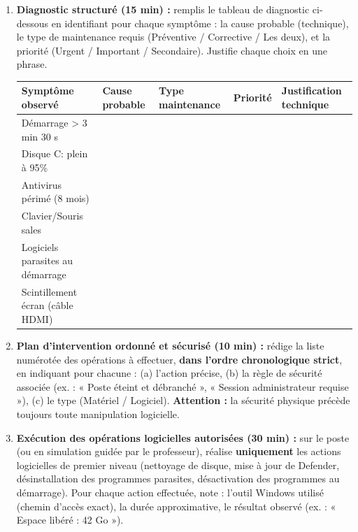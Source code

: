\documentclass[11pt]{article}
\newcommand{\cle}[1]{{\popxbold\color{popdark}#1}}
\begin{document}
\begin{enumerate}
    \item \textbf{Diagnostic structuré (15 min) :} remplis le tableau de diagnostic ci-dessous en identifiant pour chaque symptôme : la \cle{cause probable} (technique), le \cle{type de maintenance} requis (Préventive / Corrective / Les deux), et la \cle{priorité} (Urgent / Important / Secondaire). Justifie chaque choix en une phrase.
    \begin{center}
    \begin{tabularx}{\linewidth}{|X|l|l|l|X|}
    \hline
    \rowcolor{popblueL}
    \textbf{Symptôme observé} & \textbf{Cause probable} & \textbf{Type maintenance} & \textbf{Priorité} & \textbf{Justification technique} \\
    \hline
    Démarrage > 3 min 30 s & & & & \\
    \hline
    Disque C: plein à 95\% & & & & \\
    \hline
    Antivirus périmé (8 mois) & & & & \\
    \hline
    Clavier/Souris sales & & & & \\
    \hline
    Logiciels parasites au démarrage & & & & \\
    \hline
    Scintillement écran (câble HDMI) & & & & \\
    \hline
    \end{tabularx}
    \end{center}

    \item \textbf{Plan d'intervention ordonné et sécurisé (10 min) :} rédige la liste numérotée des opérations à effectuer, \textbf{dans l'ordre chronologique strict}, en indiquant pour chacune : (a) l'action précise, (b) la règle de sécurité associée (ex. : « Poste éteint et débranché », « Session administrateur requise »), (c) le type (Matériel / Logiciel). \textbf{Attention :} la sécurité physique précède toujours toute manipulation logicielle.

    \item \textbf{Exécution des opérations logicielles autorisées (30 min) :} sur le poste (ou en simulation guidée par le professeur), réalise \textbf{uniquement} les actions logicielles de premier niveau (nettoyage de disque, mise à jour de Defender, désinstallation des programmes parasites, désactivation des programmes au démarrage). Pour chaque action effectuée, note : l'outil Windows utilisé (chemin d'accès exact), la durée approximative, le résultat observé (ex. : « Espace libéré : 42 Go »).


\end{enumerate}
\end{document}

